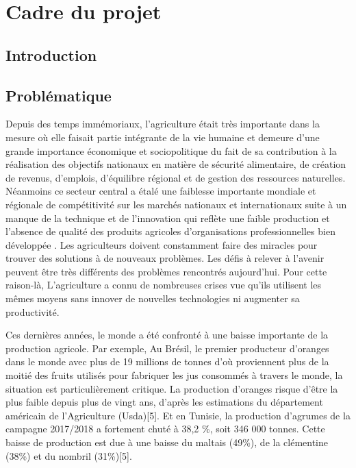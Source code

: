 
	\chapter{Cadre du projet }
	\newpage
	
	
	\section{Introduction }

	
	\section{Problématique }
	Depuis des temps immémoriaux, l'agriculture était très importante dans la mesure où elle faisait partie intégrante de la vie humaine et demeure d’une grande importance économique et sociopolitique du fait de sa contribution à la réalisation des objectifs nationaux en matière de sécurité alimentaire, de création de revenus, d’emplois, d’équilibre régional et de gestion des ressources naturelles. Néanmoins ce secteur central a étalé une faiblesse importante mondiale et régionale de compétitivité sur les marchés nationaux et internationaux suite à un manque de la technique et de l'innovation qui reflète une faible production et l'absence de qualité des produits agricoles d'organisations professionnelles bien développée . Les agriculteurs doivent constamment faire des miracles pour trouver des solutions à de nouveaux problèmes. Les défis à relever à l'avenir peuvent être très différents des problèmes rencontrés aujourd’hui. Pour cette raison-là, L'agriculture a connu de nombreuses crises vue qu’ils utilisent les mêmes moyens sans innover de nouvelles technologies ni augmenter sa productivité.
	
	Ces dernières années, le monde a été confronté à une baisse importante de la production agricole. Par exemple, Au Brésil, le premier producteur d’oranges dans le monde avec plus de 19 millions de tonnes d'où proviennent plus de la moitié des fruits utilisés pour fabriquer les jus consommés à travers le monde, la situation est particulièrement critique. La production d'oranges risque d'être la plus faible depuis plus de vingt ans, d'après les estimations du département américain de l'Agriculture (Usda)[5]. Et en Tunisie, la production d'agrumes de la campagne 2017/2018 a fortement chuté à 38,2 \%, soit 346 000 tonnes. Cette baisse de production est due à une baisse du maltais (49\%), de la clémentine (38\%) et du nombril (31\%)[5].
	
